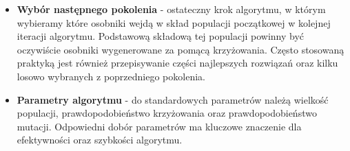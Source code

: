 \begin{itemize}
    \item \textbf{Wybór następnego pokolenia} - ostateczny krok algorytmu, w którym wybieramy które osobniki wejdą w skład populacji początkowej w 
    kolejnej iteracji algorytmu. Podstawową składową tej populacji powinny być oczywiście osobniki wygenerowane za pomącą krzyżowania. Często 
    stosowaną praktyką jest również przepisywanie części najlepszych rozwiązań oraz kilku losowo wybranych z poprzedniego pokolenia. 

    \item \textbf{Parametry algorytmu} - do standardowych parametrów należą wielkość populacji, prawdopodobieństwo krzyżowania oraz prawdopodobieństwo 
    mutacji. Odpowiedni dobór parametrów ma kluczowe znaczenie dla efektywności oraz szybkości algorytmu.

\end{itemize}